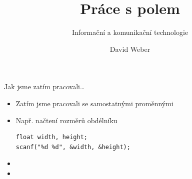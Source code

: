 \documentclass[14pt,aspectratio=169]{beamer}
\subtitle{Informační a komunikační technologie}
\title{Práce s polem}
\author{David Weber}
\begin{document}

    \begin{frame}
        \titlepage
    \end{frame}

    \begin{frame}[t,fragile]{Jak jsme zatím pracovali\dots}
        \begin{itemize}
            \item Zatím jsme pracovali se samostatnými proměnnými
            \item Např. načtení rozměrů obdélníku
            \begin{lstlisting}
float width, height;
scanf("%d %d", &width, &height);
            \end{lstlisting}
            \item {} 
            \item {} 
        \end{itemize}
    \end{frame}
\end{document}

